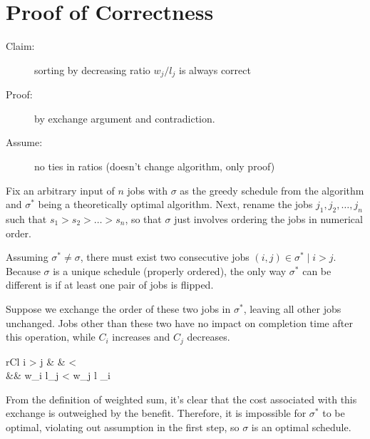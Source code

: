 \documentclass[11pt]{article}
\begin{document}
\section{Proof of Correctness}
	\begin{description}
		\item[Claim:] sorting by decreasing ratio $w_j / l_j$ is always correct
		\item[Proof:] by exchange argument and contradiction.
		\item[Assume:] no ties in ratios (doesn't change algorithm, only proof)
	\end{description}
	
	Fix an arbitrary input of $n$ jobs with $\sigma$ as the greedy schedule from the algorithm and $\sigma^*$ being a theoretically optimal algorithm. Next, rename the jobs $j_1, j_2, \ldots , j_n$ such that $s_1 > s_2 > \ldots > s_n$, so that $\sigma$ just involves ordering the jobs in numerical order.
	
	Assuming $\sigma^* \neq \sigma$, there must exist two consecutive jobs $(i, j) \in \sigma^* \mid i > j$. Because $\sigma$ is a unique schedule (properly ordered), the only way $\sigma^*$ can be different is if at least one pair of jobs is flipped.
	
	Suppose we exchange the order of these two jobs in $\sigma^*$, leaving all other jobs unchanged. Jobs other than these two have no impact on completion time after this operation, while $C_i$ increases and $C_j$ decreases.
	
	\begin{IEEEeqnarray}{rCl}
		i > j & \rightarrow &  < \\
		&& w_i l_j < w_j l _i
	\end{IEEEeqnarray}
	
	From the definition of weighted sum, it's clear that the cost associated with this exchange is outweighed by the benefit. Therefore, it is impossible for $\sigma^*$ to be optimal, violating out assumption in the first step, so $\sigma$ is an optimal schedule.
%		
%		


\end{document}
